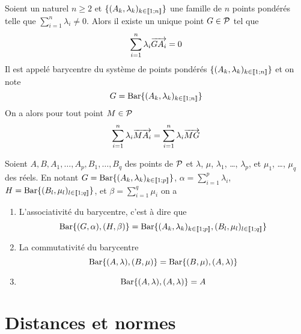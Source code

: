 \begin{prop}
  Soient un naturel \(n \geq 2\) et $\{(A_k,\lambda_k)_{k \in 
  \intervalleentier{1}{n}}\}$ une famille de \(n\) points pondérés telle que 
  \(\sum_{i=1}^n \lambda_i \neq 0\). Alors il existe un unique point \(G \in \P\) 
  tel que
  \begin{equation}
    \sum_{i=1}^n \lambda_i \vect{GA_i}=0
  \end{equation}
  Il est appelé barycentre du système de points pondérés $\{(A_k,\lambda_k)_{k 
  \in \intervalleentier{1}{n}}\}$ et on note
  \begin{equation}
    G = \Bary\{(A_k,\lambda_k)_{k \in \intervalleentier{1}{n}}\}
  \end{equation}
  On a alors pour tout point \(M \in \P\)
  \begin{equation}
    \sum_{i=1}^n \lambda_i \vect{MA_i} = \sum_{i=1}^n \lambda_i \vect{MG}
  \end{equation}
\end{prop}
\begin{prop}
  Soient \(A,B, A_1, \ldots, A_p,B_1, \ldots, B_q\) des points de \(\P\) et 
  \(\lambda\), \(\mu\), \(\lambda_1\), \ldots, \(\lambda_p\), et \(\mu_1\), \ldots, 
  \(\mu_q\) des réels. En notant $G = \Bary\{(A_k,\lambda_k)_{k \in 
  \intervalleentier{1}{p}}\}$, \(\alpha=\sum_{i=1}^p \lambda_i\), $H = 
  \Bary\{(B_l,\mu_l)_{l \in \intervalleentier{1}{q}}\}$, et $\beta=\sum_{i=1}^q 
  \mu_i$ on a
  \begin{enumerate}
    \item L'associativité du barycentre, c'est à dire que
      \begin{equation}
        \Bary\{(G,\alpha),(H,\beta)\} = \Bary\{(A_k,\lambda_k)_{k \in 
        \intervalleentier{1}{p}}, (B_l,\mu_l)_{l \in \intervalleentier{1}{q}}\}
      \end{equation}
    \item La commutativité du barycentre
      \begin{equation}
        \Bary\{(A,\lambda),(B,\mu)\}=\Bary\{(B,\mu),(A,\lambda)\}
      \end{equation}
    \item
      \begin{equation}
        \Bary\{(A,\lambda),(A,\lambda)\}=A
      \end{equation}
  \end{enumerate}
\end{prop}

\section{Distances et normes}

